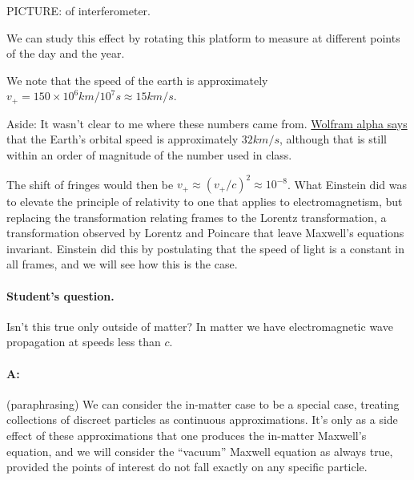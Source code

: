PICTURE: of interferometer.

We can study this effect by rotating this platform to measure at different points of the day and the year.

We note that the speed of the earth is approximately $v_{+} = 150 \times 10^6 km/ 10^7 s \approx 15 km/s$.

Aside: It wasn't clear to me where these numbers came from.  \href{http://www.wolframalpha.com/input/?i=speed+of+the+earth}{Wolfram alpha says} that the Earth's orbital speed is approximately $32 km/s$, although that is still within an order of magnitude of the number used in class.

The shift of fringes would then be $v_{+} \approx (v_{+}/c)^2 \approx 10^{-8}$.  What Einstein did was to elevate the principle of relativity to one that applies to electromagnetism, but replacing the transformation relating frames to the Lorentz transformation, a transformation observed by Lorentz and Poincare that leave Maxwell's equations invariant.  Einstein did this by postulating that the speed of light is a constant in all frames, and we will see how this is the case.

\paragraph{Student's question.}  Isn't this true only outside of matter?  In matter we have electromagnetic wave propagation at speeds less than $c$.

\paragraph{A:}  (paraphrasing) We can consider the in-matter case to be a special case, treating collections of discreet particles as continuous approximations.  It's only as a side effect of these approximations that one produces the in-matter Maxwell's equation, and we will consider the ``vacuum'' Maxwell equation as always true, provided the points of interest do not fall exactly on any specific particle.

\EndNoBibArticle

